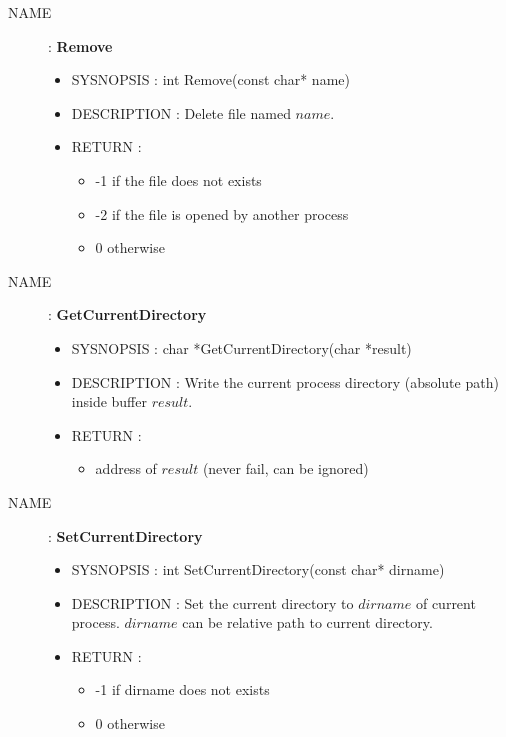 \begin{description}
            \item [NAME] : \textbf{Remove}
                \begin{itemize}
                    \item SYSNOPSIS : int Remove(const char* name)
                    \item DESCRIPTION :
                        Delete file named $name$.
                    \item RETURN :
                        \begin{itemize}
                            \item -1 if the file does not exists
                            \item -2 if the file is opened by another process
                            \item 0 otherwise
                        \end{itemize}
                \end{itemize}

            \item [NAME] : \textbf{GetCurrentDirectory}
                \begin{itemize}
                    \item SYSNOPSIS : char *GetCurrentDirectory(char *result)
                    \item DESCRIPTION :
                        Write the current process directory (absolute path) inside buffer $result$.
                    \item RETURN :
                        \begin{itemize}
                            \item address of $result$ (never fail, can be ignored)
                        \end{itemize}
                \end{itemize}

            \item [NAME] : \textbf{SetCurrentDirectory}
                \begin{itemize}
                    \item SYSNOPSIS : int SetCurrentDirectory(const char* dirname)
                    \item DESCRIPTION :
                        Set the current directory to $dirname$ of current process.
                        $dirname$ can be relative path to current directory.
                    \item RETURN :
                        \begin{itemize}
                            \item -1 if dirname does not exists
                            \item 0 otherwise
                        \end{itemize}
                \end{itemize}
        \end{description}
